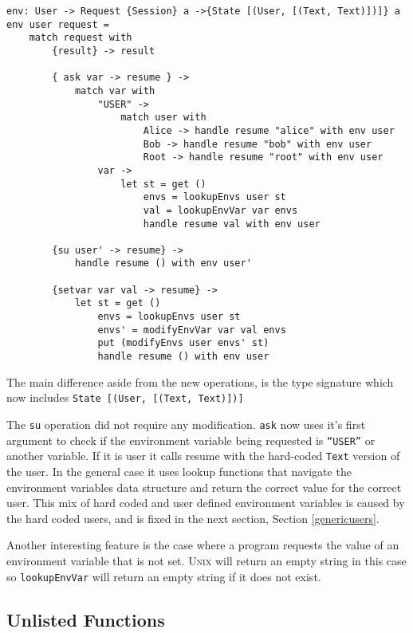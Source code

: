 \documentclass[logo,bsc,singlespacing,parskip]{infthesis}
\begin{document}
\begin{lstlisting}[language=unison]
env: User -> Request {Session} a ->{State [(User, [(Text, Text)])]} a
env user request = 
    match request with
        {result} -> result

        { ask var -> resume } -> 
            match var with 
                "USER" ->
                    match user with 
                        Alice -> handle resume "alice" with env user
                        Bob -> handle resume "bob" with env user
                        Root -> handle resume "root" with env user
                var -> 
                    let st = get ()
                        envs = lookupEnvs user st
                        val = lookupEnvVar var envs
                        handle resume val with env user

        {su user' -> resume} -> 
            handle resume () with env user'

        {setvar var val -> resume} -> 
            let st = get ()
                envs = lookupEnvs user st
                envs' = modifyEnvVar var val envs
                put (modifyEnvs user envs' st) 
                handle resume () with env user
\end{lstlisting}

The main difference aside from the new operations, is the type signature which now includes \texttt{{State [(User, [(Text, Text)])]}}

The \texttt{su} operation did not require any modification. \texttt{ask} now
uses it's first argument to check if the environment variable being requested
is \texttt{``USER''} or another variable. If it is user it calls resume with
the hard-coded \texttt{Text} version of the user.  In the general case it uses
lookup functions that navigate the environment variables data structure and
return the correct value for the correct user. This mix of hard coded and user
defined environment variables is caused by the hard coded users, and is fixed
in the next section, Section \ref{genericusers}.

Another interesting feature is the case where a program requests the value of
an environment variable that is not set. \textsc{Unix} will return an empty
string in this case so \texttt{lookupEnvVar} will return an empty string if it
does not exist.

\subsection{Unlisted Functions}
\end{document}
